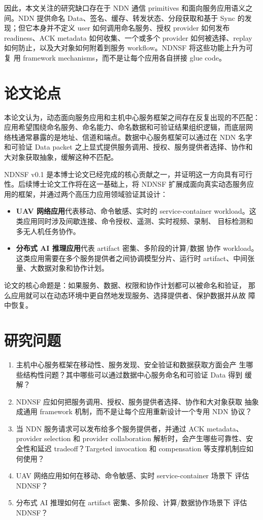 因此，本文关注的研究缺口存在于 NDN 通信 primitives 和面向服务应用语义之
间。NDN 提供命名 Data、签名、缓存、转发状态、分段获取和基于 Sync 的发
现；但它本身并不定义 user 如何调用命名服务、授权 provider 如何发布
readiness、ACK metadata 如何收集、一个或多个 provider 如何被选择、replay
如何防止，以及大对象如何附着到服务 workflow。NDNSF 将这些功能上升为可复
用 framework mechanisms，而不是让每个应用各自拼接 glue code。

\section{论文论点}

本论文认为，动态面向服务应用和主机中心服务框架之间存在反复出现的不匹配：
应用希望围绕命名服务、命名能力、命名数据和可验证结果组织逻辑，而底层网
络栈通常暴露的是地址、信道和端点。数据中心服务框架可以通过在 NDN 名字
和可验证 Data packet 之上显式提供服务调用、授权、服务提供者选择、协作和
大对象获取抽象，缓解这种不匹配。

NDNSF v0.1 是本博士论文已经完成的核心贡献之一，并证明这一方向具有可行
性。后续博士论文工作将在这一基础上，将 NDNSF 扩展成面向真实动态服务应
用的框架，并通过两个高压力应用领域验证其设计：

\begin{itemize}
  \item \textbf{UAV 网络应用}代表移动、命令敏感、实时的 service-container
  workload。这类应用同时涉及间歇连接、命令授权、遥测、实时视频、录制、
  目标检测和多无人机任务协作。
  \item \textbf{分布式 AI 推理应用}代表 artifact 密集、多阶段的计算/数据
  协作 workload。这类应用需要在多个服务提供者之间协调模型分片、运行时
  artifact、中间张量、大数据对象和协作计划。
\end{itemize}

论文的核心命题是：如果服务、数据、权限和协作计划都可以被命名和验证，
那么应用就可以在动态环境中更自然地发现服务、选择提供者、保护数据并从故
障中恢复。

\section{研究问题}

\begin{enumerate}[label=RQ\arabic*., leftmargin=*]
  \item 主机中心服务框架在移动性、服务发现、安全验证和数据获取方面会产
  生哪些结构性问题？其中哪些可以通过数据中心服务命名和可验证 Data 得到
  缓解？
  \item NDNSF 应如何把服务调用、授权、服务提供者选择、协作和大对象获取
  抽象成通用 framework 机制，而不是让每个应用重新设计一个专用 NDN 协议？
  \item 当 NDN 服务请求可以发布给多个服务提供者，并通过 ACK metadata、
  provider selection 和 provider collaboration 解析时，会产生哪些可靠性、安
  全性和延迟 tradeoff？Targeted invocation 和 compensation 等支撑机制应如
  何使用？
  \item UAV 网络应用如何在移动、命令敏感、实时 service-container 场景下
  评估 NDNSF？
  \item 分布式 AI 推理如何在 artifact 密集、多阶段、计算/数据协作场景下
  评估 NDNSF？
\end{enumerate}

